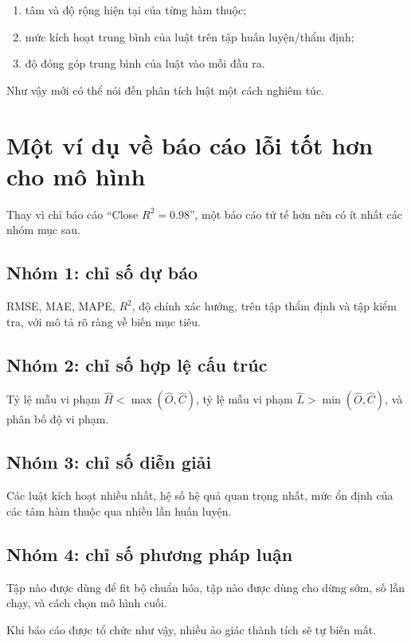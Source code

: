 \begin{enumerate}
\item tâm và độ rộng hiện tại của từng hàm thuộc;
\item mức kích hoạt trung bình của luật trên tập huấn luyện/thẩm định;
\item độ đóng góp trung bình của luật vào mỗi đầu ra.
\end{enumerate}

Như vậy mới có thể nói đến phân tích luật một cách nghiêm túc.

\section{Một ví dụ về báo cáo lỗi tốt hơn cho mô hình}

Thay vì chỉ báo cáo ``Close \(R^2=0.98\)'', một báo cáo tử tế hơn nên có ít nhất các nhóm mục sau.

\subsection{Nhóm 1: chỉ số dự báo}

RMSE, MAE, MAPE, \(R^2\), độ chính xác hướng, trên tập thẩm định và tập kiểm tra, với mô tả rõ ràng về biến mục tiêu.

\subsection{Nhóm 2: chỉ số hợp lệ cấu trúc}

Tỷ lệ mẫu vi phạm \(\hat{H}<\max(\hat{O},\hat{C})\), tỷ lệ mẫu vi phạm \(\hat{L}>\min(\hat{O},\hat{C})\), và phân bố độ vi phạm.

\subsection{Nhóm 3: chỉ số diễn giải}

Các luật kích hoạt nhiều nhất, hệ số hệ quả quan trọng nhất, mức ổn định của các tâm hàm thuộc qua nhiều lần huấn luyện.

\subsection{Nhóm 4: chỉ số phương pháp luận}

Tập nào được dùng để fit bộ chuẩn hóa, tập nào được dùng cho dừng sớm, số lần chạy, và cách chọn mô hình cuối.

Khi báo cáo được tổ chức như vậy, nhiều ảo giác thành tích sẽ tự biến mất.

